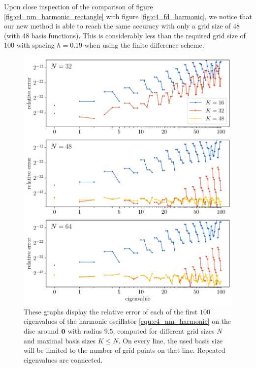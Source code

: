 Upon close inspection of the comparison of figure \ref{fig:c4_nm_harmonic_rectangle} with figure \ref{fig:c4_fd_harmonic}, we notice that our new method is able to reach the same accuracy with only a grid size of $48$ (with $48$ basis functions). This is considerably less than the required grid size of $100$ with spacing $h = 0.19$ when using the finite difference scheme.

\begin{figure}
    \begin{center}
        \includegraphics[width=\textwidth]{img/chapter4/nm_test_harmonic_disc.pdf}
    \end{center}
    \caption{These graphs display the relative error of each of the first $100$ eigenvalues of the harmonic oscillator \eqref{equ:c4_nm_harmonic} on the disc around $\vb{0}$ with radius $9.5$, computed for different grid sizes $N$ and maximal basis sizes $K \leq N$. On every line, the used basis size will be limited to the number of grid points on that line. Repeated eigenvalues are connected.}
    \label{fig:c4_nm_harmonic_disc}
\end{figure}


